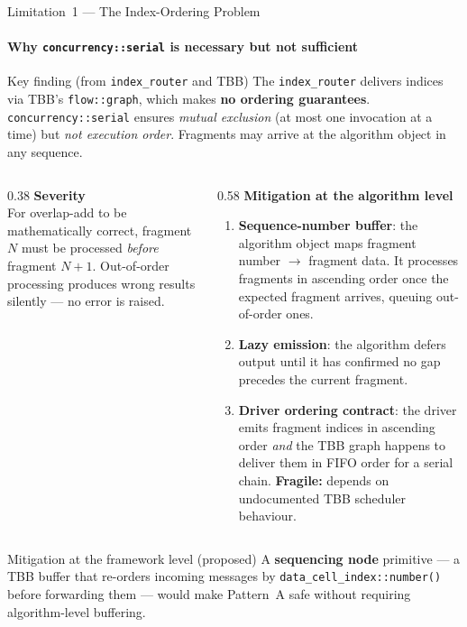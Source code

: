 \documentclass[aspectratio=169,10pt]{beamer}
\newcommand{\bad}[1]{\textcolor{red!70!black}{\textbf{#1}}}
\newcommand{\warn}[1]{\textcolor{orange!80!black}{\textbf{#1}}}
\newcommand{\code}[1]{\texttt{\small #1}}
\begin{document}
\begin{frame}{Limitation~1 --- The Index-Ordering Problem}
  \framesubtitle{Why \texttt{concurrency::serial} is necessary but not sufficient}

  \begin{alertblock}{Key finding (from \texttt{index\_router} and TBB)}
    The \code{index\_router} delivers indices via TBB's
    \code{flow::graph}, which makes \bad{no ordering guarantees}.
    \code{concurrency::serial} ensures \emph{mutual exclusion}
    (at most one invocation at a time) but \emph{not execution order}.
    Fragments may arrive at the algorithm object in any sequence.
  \end{alertblock}

  \medskip
  \begin{columns}[T]
    \begin{column}{0.38\textwidth}
      \textbf{Severity} \\[4pt]
      \small
      For overlap-add to be mathematically correct, fragment $N$ must be
      processed \emph{before} fragment $N{+}1$.  Out-of-order processing
      produces wrong results silently --- no error is raised.
    \end{column}
    \begin{column}{0.58\textwidth}
      \textbf{Mitigation at the algorithm level} \\[4pt]
      \small
      \begin{enumerate}
        \item \textbf{Sequence-number buffer}: the algorithm object maps
              fragment number $\to$ fragment data.  It processes
              fragments in ascending order once the expected fragment
              arrives, queuing out-of-order ones.
        \item \textbf{Lazy emission}: the algorithm defers output until
              it has confirmed no gap precedes the current fragment.
        \item \textbf{Driver ordering contract}: the driver emits
              fragment indices in ascending order \emph{and} the TBB
              graph happens to deliver them in FIFO order for a serial
              chain.  \warn{Fragile:} depends on undocumented TBB
              scheduler behaviour.
      \end{enumerate}
    \end{column}
  \end{columns}

  \medskip
  \begin{exampleblock}{Mitigation at the framework level (proposed)}
    A \textbf{sequencing node} primitive --- a TBB buffer that re-orders
    incoming messages by \code{data\_cell\_index::number()} before
    forwarding them --- would make Pattern~A safe without requiring
    algorithm-level buffering.
  \end{exampleblock}
\end{frame}
\end{document}
